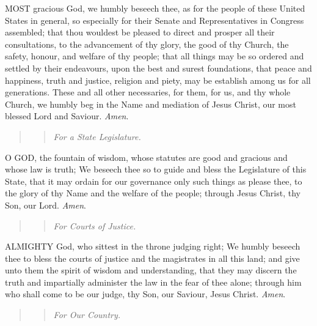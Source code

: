 MOST
gracious God, we humbly beseech thee, as for the people of these United
States in general, so especially for their Senate and Representatives
in Congress assembled; that thou wouldest be pleased to direct and prosper
all their consultations, to the advancement of thy glory, the good of
thy Church, the safety, honour, and welfare of thy people; that all things
may be so ordered and settled by their endeavours, upon the best and surest
foundations, that peace and happiness, truth and justice, religion and
piety, may be establish among us for all generations. These and all other
necessaries, for them, for us, and thy whole Church, we humbly beg in
the Name and mediation of Jesus Christ, our most blessed Lord and Saviour.
\emph{Amen}.

\begin{quote}

\begin{quote}

\emph{For
a State Legislature.}

\end{quote}

\end{quote}

O
GOD, the fountain of wisdom, whose statutes are good and gracious and
whose law is truth; We beseech thee so to guide and bless the Legislature
of this State, that it may ordain for our governance only such things
as please thee, to the glory of thy Name and the welfare of the people;
through Jesus Christ, thy Son, our Lord. \emph{Amen}.

\begin{quote}

\begin{quote}

\emph{For
Courts of Justice.}

\end{quote}

\end{quote}

ALMIGHTY
God, who sittest in the throne judging right; We humbly beseech thee to
bless the courts of justice and the magistrates in all this land; and
give unto them the spirit of wisdom and understanding, that they may
discern the truth and impartially administer the law in the fear of thee
alone; through him who shall come to be our judge, thy Son, our Saviour,
Jesus Christ. \emph{Amen}.

\begin{quote}

\begin{quote}

\emph{For
Our Country.}

\end{quote}

\end{quote}

